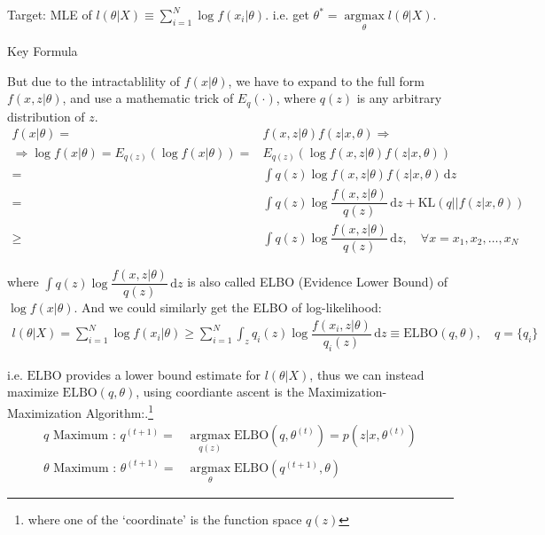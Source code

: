     Target: MLE of $ l(\theta|X)\equiv \sum_{i=1}^N\log f(x_i|\theta) $. i.e. get $ \theta ^*=\mathop{\arg\max}\limits_{\theta} l(\theta|X) $. 
    
\begin{point}
    Key Formula
\end{point}

    But due to the intractablility of $ f(x|\theta ) $, we have to expand to the full form $ f(x,z|\theta) $, and use a mathematic trick of $ E_q(\cdot) $, where $ q(z) $ is any arbitrary distribution of $ z $. 
\begin{align}
    f(x|\theta )=&f(x,z|\theta )f(z|x,\theta )\Rightarrow \\
    \Rightarrow \log f(x|\theta )=E_{q(z)}\left(\log f(x|\theta )\right)=&E_{q(z)}\left(\log f(x,z|\theta )f(z|x,\theta )\right)\\
    =&\int q(z)\log f(x,z|\theta )f(z|x,\theta ) \,\mathrm{d}z\\
    =&\int q(z)\log \dfrac{f(x,z|\theta )}{q(z)} \,\mathrm{d}z +\mathrm{KL}\left(q||f(z|x,\theta )\right) \\
    \geq&\int q(z) \log \dfrac{f(x,z|\theta )}{q(z)}\,\mathrm{d}z ,\quad \forall x=x_1,x_2,\ldots,x_N
\end{align}

    where $ \displaystyle\int q(z)\log \dfrac{f(x,z|\theta )}{q(z)} \,\mathrm{d}z  $ is also called ELBO (Evidence Lower Bound) of $ \log f(x|\theta ) $. And we could similarly get the ELBO of log-likelihood:
    \begin{align}
        l(\theta |X)=\sum_{i=1}^N\log f(x_i|\theta )\geq \sum_{i=1}^N\int_z q_i(z)\log\dfrac{f(x_i,z|\theta )}{q_i(z)} \,\mathrm{d}z\equiv \mathrm{ELBO}(q,\theta ),\quad q=\{q_i\}
    \end{align}
    
    i.e. $ \mathrm{ELBO}  $ provides a lower bound estimate for $ l(\theta |X) $, thus we can instead maximize $ \mathrm{ELBO}(q,\theta)  $, using coordiante ascent is the Maximization-Maximization Algorithm:.\footnote{where one of the `coordinate' is the function space $ q(z) $}
\begin{align}
        q\text{ Maximum : }q^{(t+1)}=&\mathop{\arg\max}\limits_{q(z)}\mathrm{ELBO}(q,\theta ^{(t)})=p(z|x,\theta ^{(t)})\\
        \theta \text{ Maximum : }\theta ^{(t+1)}=&\mathop{\arg\max}\limits_{\theta }\mathrm{ELBO} (q^{(t+1)},\theta ) 
\end{align}

